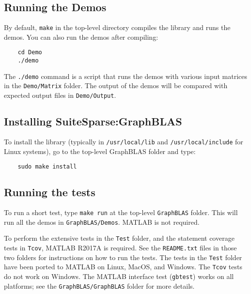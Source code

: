 \documentclass[12pt]{article}
\begin{document}
\subsection{Running the Demos}

By default, \verb'make' in the top-level directory compiles the library
and runs the demos.  You can also run the demos after compiling:

    {\small
    \begin{verbatim}
    cd Demo
    ./demo \end{verbatim} }

The \verb'./demo' command is a script that runs the demos with various input
matrices in the \verb'Demo/Matrix' folder.  The output of the demos will be
compared with expected output files in \verb'Demo/Output'.

\subsection{Installing SuiteSparse:GraphBLAS}

To install the library (typically in \verb'/usr/local/lib' and
\verb'/usr/local/include' for Linux systems), go to the top-level GraphBLAS
folder and type:

    {\small
    \begin{verbatim}
    sudo make install \end{verbatim} }

\subsection{Running the tests}

To run a short test, type \verb'make run' at the top-level \verb'GraphBLAS'
folder.  This will run all the demos in \verb'GraphBLAS/Demos'.  MATLAB is not
required.

To perform the extensive tests in the \verb'Test' folder, and the statement
coverage tests in \verb'Tcov', MATLAB R2017A is required.  See the
\verb'README.txt' files in those two folders for instructions on how to run the
tests.  The tests in the \verb'Test' folder have been ported to MATLAB on
Linux, MacOS, and Windows.  The \verb'Tcov' tests do not work on Windows.  The
MATLAB interface test (\verb'gbtest') works on all platforms; see the
\verb'GraphBLAS/GraphBLAS' folder for more details.
\end{document}
